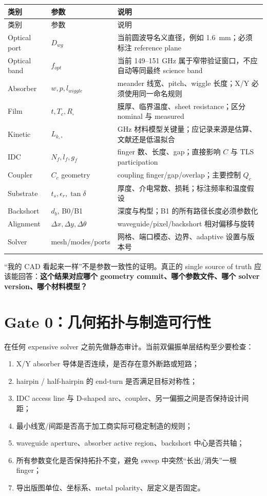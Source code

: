\documentclass[11pt,a4paper,openany]{ctexrep}
\begin{document}
\begin{longtable}{p{3.0cm}p{3.0cm}p{7.4cm}}
\toprule
类别 & 参数 & 说明 \\
\midrule
\endfirsthead
\toprule
类别 & 参数 & 说明 \\
\midrule
\endhead
Optical port & $D_{wg}$ & 当前圆波导名义直径，例如 \SI{1.6}{mm}；必须标注 reference plane \\
Optical band & $f_{opt}$ & 当前 149--151 GHz 属于窄带验证窗口，不应自动等同最终 science band \\
Absorber & $w,p,l_{wiggle}$ & meander 线宽、pitch、wiggle 长度；X/Y 必须使用同一命名规则 \\
Film & $t,T_c,R_\square$ & 膜厚、临界温度、sheet resistance；区分 nominal 与 measured \\
Kinetic & $L_{k,\square}$ & GHz 材料模型关键量；应记录来源是估算、文献还是低温拟合 \\
IDC & $N_f,l_f,g_f$ & finger 数、长度、gap；直接影响 $C$ 与 TLS participation \\
Coupler & $C_c$ geometry & coupling finger/gap/overlap；主要控制 $Q_c$ \\
Substrate & $t_s,\epsilon_r,\tan\delta$ & 厚度、介电常数、损耗；标注频率和温度假设 \\
Backshort & $d_b$, B0/B1 & 深度与构型；B1 的所有路径长度必须参数化 \\
Alignment & $\Delta x,\Delta y,\Delta\theta$ & waveguide/pixel/backshort 相对偏移与旋转 \\
Solver & mesh/modes/ports & 网格、端口模态、边界、adaptive 设置与版本号 \\
\bottomrule
\end{longtable}

\begin{mistakebox}
“我的 CAD 看起来一样”不是参数一致性的证明。真正的 single source of truth 应该能回答：\textbf{这个结果对应哪个 geometry commit、哪个参数文件、哪个 solver version、哪个材料模型？}
\end{mistakebox}

\section{Gate 0：几何拓扑与制造可行性}

在任何 expensive solver 之前先做静态审计。当前双偏振单层结构至少要检查：
\begin{enumerate}
  \item X/Y absorber 导体是否连续，是否存在意外断路或短路；
  \item hairpin / half-hairpin 的 end-turn 是否满足目标对称性；
  \item IDC access line 与 D-shaped arc、coupler、另一偏振之间是否保持设计间距；
  \item 最小线宽/间距是否高于加工商实际可稳定制造的规则；
  \item waveguide aperture、absorber active region、backshort 中心是否共轴；
  \item 所有参数变化是否保持拓扑不变，避免 sweep 中突然“长出/消失”一根 finger；
  \item 导出版图单位、坐标系、metal polarity、层定义是否固定。
\end{enumerate}
\end{document}
